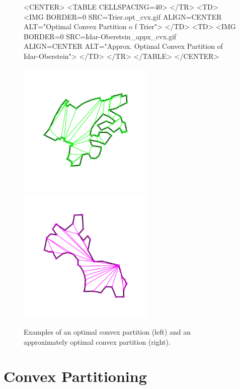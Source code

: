 \begin{figure}
\begin{ccHtmlOnly}
<CENTER>
<TABLE CELLSPACING=40>
</TR>
<TD>
<IMG BORDER=0 SRC=Trier.opt_cvx.gif ALIGN=CENTER ALT="Optimal Convex Partition o
f Trier">
</TD>
<TD>
<IMG BORDER=0 SRC=Idar-Oberstein_appx_cvx.gif ALIGN=CENTER ALT="Approx. Optimal
Convex Partition of Idar-Oberstein">
</TD>
</TR>
</TABLE>
</CENTER>
\end{ccHtmlOnly}

\begin{ccTexOnly}
\begin{center}
\includegraphics[width=6.5cm]{Partition_2/Trier_opt_cvx}
\includegraphics[width=6.5cm]{Partition_2/Idar-Oberstein_appx_cvx}
\end{center}
\end{ccTexOnly}
\caption{Examples of an optimal convex partition (left) and an approximately
optimal convex partition (right).}
\end{figure}


\section{Convex Partitioning}
\label{sec:partition_2_convex}


